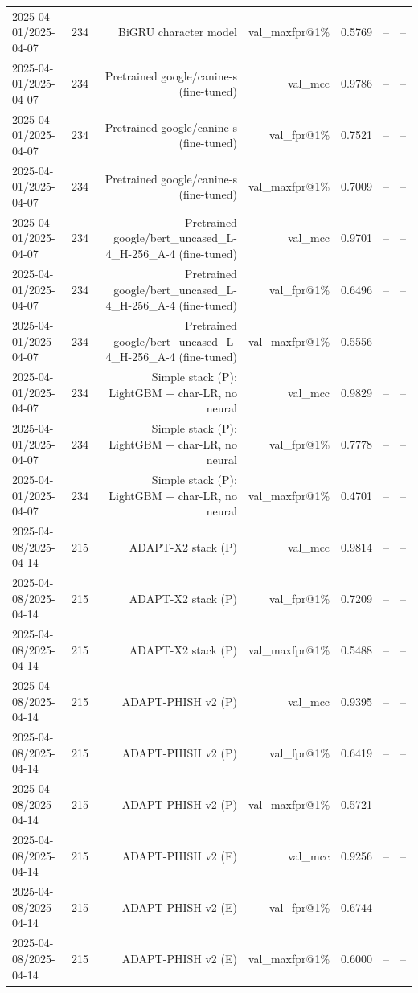 \begin{table}[t]
\begin{tabular}{llrrrrr}
2025-04-01/2025-04-07 & 234 & BiGRU character model & val\_maxfpr@1\% & 0.5769 & -- & -- \\
2025-04-01/2025-04-07 & 234 & Pretrained google/canine-s (fine-tuned) & val\_mcc & 0.9786 & -- & -- \\
2025-04-01/2025-04-07 & 234 & Pretrained google/canine-s (fine-tuned) & val\_fpr@1\% & 0.7521 & -- & -- \\
2025-04-01/2025-04-07 & 234 & Pretrained google/canine-s (fine-tuned) & val\_maxfpr@1\% & 0.7009 & -- & -- \\
2025-04-01/2025-04-07 & 234 & Pretrained google/bert\_uncased\_L-4\_H-256\_A-4 (fine-tuned) & val\_mcc & 0.9701 & -- & -- \\
2025-04-01/2025-04-07 & 234 & Pretrained google/bert\_uncased\_L-4\_H-256\_A-4 (fine-tuned) & val\_fpr@1\% & 0.6496 & -- & -- \\
2025-04-01/2025-04-07 & 234 & Pretrained google/bert\_uncased\_L-4\_H-256\_A-4 (fine-tuned) & val\_maxfpr@1\% & 0.5556 & -- & -- \\
2025-04-01/2025-04-07 & 234 & Simple stack (P): LightGBM + char-LR, no neural & val\_mcc & 0.9829 & -- & -- \\
2025-04-01/2025-04-07 & 234 & Simple stack (P): LightGBM + char-LR, no neural & val\_fpr@1\% & 0.7778 & -- & -- \\
2025-04-01/2025-04-07 & 234 & Simple stack (P): LightGBM + char-LR, no neural & val\_maxfpr@1\% & 0.4701 & -- & -- \\
2025-04-08/2025-04-14 & 215 & ADAPT-X2 stack (P) & val\_mcc & 0.9814 & -- & -- \\
2025-04-08/2025-04-14 & 215 & ADAPT-X2 stack (P) & val\_fpr@1\% & 0.7209 & -- & -- \\
2025-04-08/2025-04-14 & 215 & ADAPT-X2 stack (P) & val\_maxfpr@1\% & 0.5488 & -- & -- \\
2025-04-08/2025-04-14 & 215 & ADAPT-PHISH v2 (P) & val\_mcc & 0.9395 & -- & -- \\
2025-04-08/2025-04-14 & 215 & ADAPT-PHISH v2 (P) & val\_fpr@1\% & 0.6419 & -- & -- \\
2025-04-08/2025-04-14 & 215 & ADAPT-PHISH v2 (P) & val\_maxfpr@1\% & 0.5721 & -- & -- \\
2025-04-08/2025-04-14 & 215 & ADAPT-PHISH v2 (E) & val\_mcc & 0.9256 & -- & -- \\
2025-04-08/2025-04-14 & 215 & ADAPT-PHISH v2 (E) & val\_fpr@1\% & 0.6744 & -- & -- \\
2025-04-08/2025-04-14 & 215 & ADAPT-PHISH v2 (E) & val\_maxfpr@1\% & 0.6000 & -- & -- \\

\end{tabular}
\end{table}
